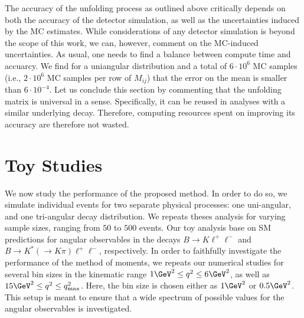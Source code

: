 \documentclass[aps,prd,reprint,nofootinbib,preprintnumbers]{revtex4}
\begin{document}
The accuracy of the unfolding process as outlined above critically depends on both the accuracy
of the detector simulation, as well as the uncertainties induced by the MC estimates. While
considerations of any detector simulation is beyond the scope of this work, we can, however,
comment on the MC-induced uncertainties. As usual, one needs to find a balance between
compute time and accuarcy. We find for a uniangular distribution and a total of $6\cdot 10^6$ MC
samples (i.e., $2 \cdot 10^6$ MC samples per row of $M_{ij}$) that the error on the mean is
smaller than $6\cdot 10^{-4}$. Let us conclude this section by commenting that the unfolding
matrix is universal in a sense. Specifically, it can be reused in analyses with a similar underlying decay.
Therefore, computing resources spent on improving its accuracy are therefore not wasted.


\section{Toy Studies}
\label{sec:numerics}

We now study the performance of the proposed method. In order to do so, we simulate
individual events for two separate physical processes: one uni-angular, and one tri-angular decay
distribution. We repeats theses analysis for varying sample sizes, ranging from
$50$ to $500$ events. Our toy analysis base on SM predictions for angular observables
in the decays $B\to K\ell^+\ell^-$ and $B\to K^*(\to K\pi)\ell^+\ell^-$, respectively.
In order to faithfully investigate the performance of the method of moments, we repeats our
numerical studies for several bin sizes in the kinematic range $1 \GeV^2 \leq q^2 \leq 6\GeV^2$,
as well as $15 \GeV^2 \leq q^2 \leq q^2_\text{max}$. Here, the bin size is chosen either
as $1\GeV^2$ or $0.5\GeV^2$. This setup is meant to ensure that a wide spectrum of possible
values for the angular observables is investigated.\\
\end{document}
